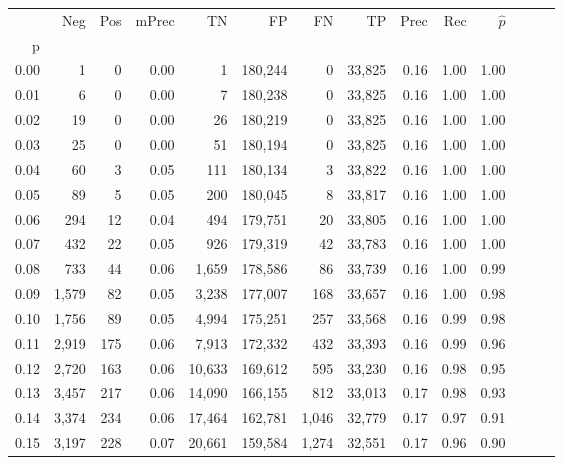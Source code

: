 \begin{tabular}{rrrrrrrrrrrrrr}
\toprule
{} &    Neg &  Pos & mPrec &       TN &       FP &      FN &      TP &  Prec &   Rec & $\hat{p}$ \\
p    &        &      &       &          &          &         &         &       &       &           \\
\midrule
0.00 &      1 &    0 &  0.00 &        1 &  180,244 &       0 &  33,825 &  0.16 &  1.00 &      1.00 \\
0.01 &      6 &    0 &  0.00 &        7 &  180,238 &       0 &  33,825 &  0.16 &  1.00 &      1.00 \\
0.02 &     19 &    0 &  0.00 &       26 &  180,219 &       0 &  33,825 &  0.16 &  1.00 &      1.00 \\
0.03 &     25 &    0 &  0.00 &       51 &  180,194 &       0 &  33,825 &  0.16 &  1.00 &      1.00 \\
0.04 &     60 &    3 &  0.05 &      111 &  180,134 &       3 &  33,822 &  0.16 &  1.00 &      1.00 \\
0.05 &     89 &    5 &  0.05 &      200 &  180,045 &       8 &  33,817 &  0.16 &  1.00 &      1.00 \\
0.06 &    294 &   12 &  0.04 &      494 &  179,751 &      20 &  33,805 &  0.16 &  1.00 &      1.00 \\
0.07 &    432 &   22 &  0.05 &      926 &  179,319 &      42 &  33,783 &  0.16 &  1.00 &      1.00 \\
0.08 &    733 &   44 &  0.06 &    1,659 &  178,586 &      86 &  33,739 &  0.16 &  1.00 &      0.99 \\
0.09 &  1,579 &   82 &  0.05 &    3,238 &  177,007 &     168 &  33,657 &  0.16 &  1.00 &      0.98 \\
0.10 &  1,756 &   89 &  0.05 &    4,994 &  175,251 &     257 &  33,568 &  0.16 &  0.99 &      0.98 \\
0.11 &  2,919 &  175 &  0.06 &    7,913 &  172,332 &     432 &  33,393 &  0.16 &  0.99 &      0.96 \\
0.12 &  2,720 &  163 &  0.06 &   10,633 &  169,612 &     595 &  33,230 &  0.16 &  0.98 &      0.95 \\
0.13 &  3,457 &  217 &  0.06 &   14,090 &  166,155 &     812 &  33,013 &  0.17 &  0.98 &      0.93 \\
0.14 &  3,374 &  234 &  0.06 &   17,464 &  162,781 &   1,046 &  32,779 &  0.17 &  0.97 &      0.91 \\
0.15 &  3,197 &  228 &  0.07 &   20,661 &  159,584 &   1,274 &  32,551 &  0.17 &  0.96 &      0.90 \\

\end{tabular}

